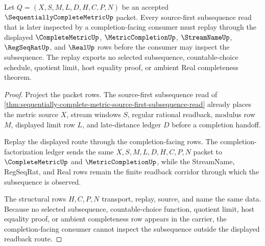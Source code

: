 \begin{theorem}
\label{thm:sequentially-complete-metric-source-first-subsequence-readback}
Let $Q=(X,S,M,L,D,H,C,P,N)$ be an accepted $\SequentiallyCompleteMetricUp$ packet. Every source-first subsequence read that is later inspected by a completion-facing consumer must replay through the displayed $\CompleteMetricUp$, $\MetricCompletionUp$, $\StreamNameUp$, $\RegSeqRatUp$, and $\RealUp$ rows before the consumer may inspect the subsequence. The replay exports no selected subsequence, countable-choice schedule, quotient limit, host equality proof, or ambient Real completeness theorem.
\end{theorem}
\begin{proof}
Project the packet rows. The source-first subsequence read of \autoref{thm:sequentially-complete-metric-source-first-subsequence-read} already places the metric source $X$, stream windows $S$, regular rational readback, modulus row $M$, displayed limit row $L$, and late-distance ledger $D$ before a completion handoff.

Replay the displayed route through the completion-facing rows. The completion-factorization ledger sends the same $X,S,M,L,D,H,C,P,N$ packet to $\CompleteMetricUp$ and $\MetricCompletionUp$, while the StreamName, RegSeqRat, and Real rows remain the finite readback corridor through which the subsequence is observed.

The structural rows $H,C,P,N$ transport, replay, source, and name the same data. Because no selected subsequence, countable-choice function, quotient limit, host equality proof, or ambient completeness row appears in the carrier, the completion-facing consumer cannot inspect the subsequence outside the displayed readback route.
\end{proof}

